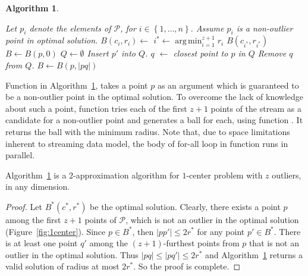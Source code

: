 \documentclass[envcountsame]{cls/cccg15}
\newtheorem{algorithm}{Algorithm}
\DeclareMathOperator*{\argmin}{arg\,min}
\newcommand{\set}[1]{\left\{ #1 \right\}}
\newcommand{\card}[1]{\left|{#1}\right|}
\newcommand{\lee}{\leqslant}
\renewcommand{\le}{\lee}
\begin{document}
\begin{algorithm}
\label{alg:1center}
\leavevmode
\begin{algorithmic}
	\State Let $p_i$ denote the elements of $\mathcal{P}$, for $i \in \set{1, \dots, n}$.
		\State Assume $p_i$ is a non-outlier point in optimal solution.
		\State $B(c_i, r_i) \gets$ 
	\EndFor
	\State $i^* \gets \argmin_{i=1}^{z+1} r_i$
	\State \Return $B(c_{i^*}, r_{i^*})$
\EndFunction
\Statex
{}
	\State $B \gets B(p, 0)$
	\State $Q \gets \emptyset$
			\State Insert $p'$ into $Q$.
			\If{$\card{Q} = z + 1$}
				\State $q$ $\gets$ closest point to $p$ in $Q$
				\State Remove $q$ from $Q$.
				\State $B \gets B(p, \card{pq})$
			\EndIf
		\EndIf
	\EndFor
	\State {}
\EndFunction
\end{algorithmic}
\end{algorithm}
Function  in Algorithm~\ref{alg:1center}, takes a point $p$ as an argument which is guaranteed to be a non-outlier point in the optimal solution. To overcome the lack of knowledge about such a point, function  tries each of the first $z+1$ points of the stream as a candidate for a non-outlier point and generates a ball for each, using function . It returns the ball with the minimum radius. Note that, due to space limitations inherent to streaming data model, the body of for-all loop in function  runs in parallel.

\begin{theorem}
Algorithm~\ref{alg:1center} is a $2$-approximation algorithm for $1$-center problem with $z$ outliers, in any dimension.
\end{theorem}

\begin{proof}
Let $B^*(c^*, r^*)$ be the optimal solution. Clearly, there exists a point $p$ among the first $z+1$ points of $\mathcal{P}$, which is not an outlier in the optimal solution (Figure~\ref{fig:1center}). Since $p \in B^*$, then $\card{pp'} \le 2r^*$ for any point $p'\in B^*$. There is at least one point $q'$ among the $(z+1)$-furthest points from $p$ that is not an outlier in the optimal solution. Thus $\card{pq} \le \card{pq'} \le 2r^*$ and Algorithm~\ref{alg:1center} returns a valid solution of radius at most $2r^*$. So the proof is complete.
\end{proof}
\end{document}
